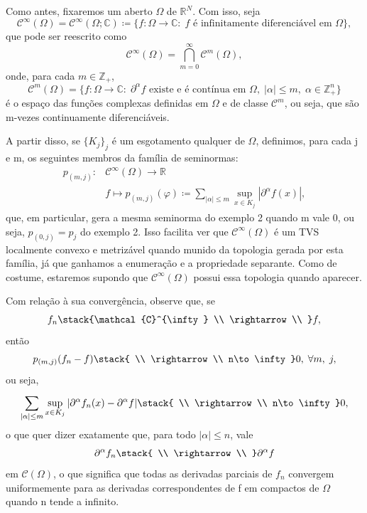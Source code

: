 \documentclass[../distribution_theory_notes.tex]{subfiles}
\begin{document}
  \begin{example}
  Como antes, fixaremos um aberto \(\Omega \) de \(\mathbb{R}^{N}\). Com isso, seja 
    \[
      \mathcal{C}^{\infty}(\Omega )=\mathcal{C}^{\infty}(\Omega ; \mathbb{C})\coloneqq \{f:\Omega \rightarrow \mathbb{C}:\; f \text{ é infinitamente diferenciável em }\Omega \},
    \]
    que pode ser reescrito como 
      \[
        \mathcal{C}^{\infty}(\Omega )=\bigcap_{m=0}^{\infty}\mathcal{C}^{m}(\Omega ),
      \]
      onde, para cada \(m\in \mathbb{Z}_{+}\), 
        \[
          \mathcal{C}^{m}(\Omega )=\{f:\Omega \rightarrow \mathbb{C}:\; \partial^{\alpha }f \text{ existe e é contínua em }\Omega,\; |\alpha |\leq m,\; \alpha \in \mathbb{Z}_{+}^{n}\}
        \]
        é o espaço das funções complexas definidas em \(\Omega \) e de classe \(\mathcal{C}^{m}\), ou seja, que são m-vezes continuamente diferenciáveis.

        A partir disso, se \(\{K_{j}\}_{j}\) é um esgotamento qualquer de \(\Omega \), definimos, para cada j e m, os seguintes membros da família de seminormas: 
       \begin{align*}
         p_{(m, j)}:&\mathcal{C}^{\infty}(\Omega )\rightarrow \mathbb{R}\\
                    &f \mapsto p_{(m, j)}(\varphi )\coloneqq \sum\limits_{|\alpha |\leq m}^{}\sup_{x\in K_{j}}|\partial^{\alpha }f(x)|, 
       \end{align*}
       que, em particular, gera a mesma seminorma do exemplo 2 quando m vale 0, ou seja, \(p_{(0, j)}=p_{j}\) do exemplo 2. Isso facilita ver que \(\mathcal{C}^{\infty}(\Omega )\) é um TVS localmente convexo e metrizável quando munido da topologia gerada por esta família, já que ganhamos a enumeração e a propriedade separante. Como de costume, estaremos supondo que \(\mathcal{C}^{\infty}(\Omega )\) possui essa topologia quando aparecer.

       Com relação à sua convergência, observe que, se 
         \[
           f_{n}\stack{\mathcal{C}^{\infty} \\ \rightarrow \\ }f,
         \]
         então 
           \[
             p_{(m, j)}(f_{n}-f)\stack{ \\ \rightarrow \\ n\to \infty}0,\; \forall m,\; j,
           \]
           ou seja, 
             \[
               \sum\limits_{|\alpha |\leq m}^{}\sup_{x\in K_{j}}|\partial^{\alpha }f_{n}(x)-\partial^{\alpha }f|\stack{ \\ \rightarrow \\ n\to \infty}0,
             \]
             o que quer dizer exatamente que, para todo \(|\alpha |\leq n\), vale 
               \[
                 \partial^{\alpha }f_{n}\stack{ \\ \rightarrow \\ }\partial^{\alpha }f
               \]
               em \(\mathcal{C}(\Omega )\), o que significa que todas as derivadas parciais de \(f_{n}\) convergem uniformemente para as derivadas correspondentes de f em compactos de \(\Omega \) quando n tende a infinito.


\end{example}
\end{document}
